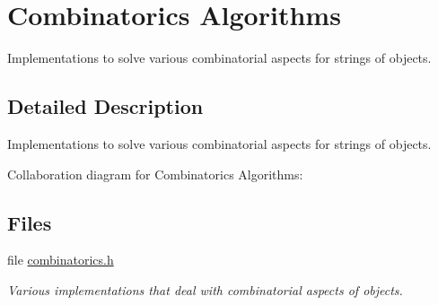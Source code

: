 \hypertarget{group__combinatorics__utils}{}\section{Combinatorics Algorithms}
\label{group__combinatorics__utils}


Implementations to solve various combinatorial aspects for strings of objects.  




\subsection{Detailed Description}
Implementations to solve various combinatorial aspects for strings of objects. 

Collaboration diagram for Combinatorics Algorithms\+:
\subsection*{Files}
\begin{DoxyCompactItemize}
\item 
file \mbox{\hyperlink{combinatorics_8h}{combinatorics.\+h}}
\begin{DoxyCompactList}\small\item\em Various implementations that deal with combinatorial aspects of objects. \end{DoxyCompactList}\end{DoxyCompactItemize}
